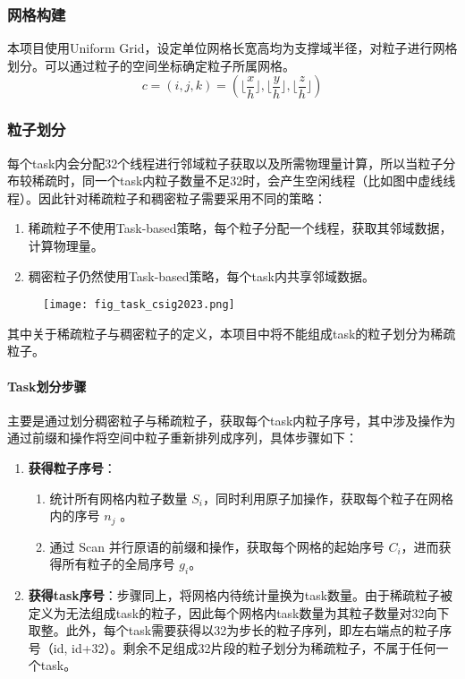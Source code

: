 \subsubsection{网格构建}
本项目使用Uniform Grid，设定单位网格长宽高均为支撑域半径，对粒子进行网格划分。可以通过粒子的空间坐标确定粒子所属网格。
\begin{equation}
	c=(i,j,k)=(\lfloor\frac{x}{h}\rfloor, \lfloor\frac{y}{h}\rfloor,\lfloor\frac{z}{h}\rfloor)
\end{equation}
\subsubsection{粒子划分}
每个task内会分配32个线程进行邻域粒子获取以及所需物理量计算，所以当粒子分布较稀疏时，同一个task内粒子数量不足32时，会产生空闲线程（比如图中虚线线程）。因此针对稀疏粒子和稠密粒子需要采用不同的策略：
\begin{enumerate}
	\item 稀疏粒子不使用Task-based策略，每个粒子分配一个线程，获取其邻域数据，计算物理量。
	\item 稠密粒子仍然使用Task-based策略，每个task内共享邻域数据。
\end{enumerate}

\begin{figure}[H]
	\centering
	\texttt{[image: fig\_task\_csig2023.png]}
\end{figure}

其中关于稀疏粒子与稠密粒子的定义，本项目中将不能组成task的粒子划分为稀疏粒子。
\paragraph{Task划分步骤}
主要是通过划分稠密粒子与稀疏粒子，获取每个task内粒子序号，其中涉及操作为通过前缀和操作将空间中粒子重新排列成序列，具体步骤如下：
\begin{enumerate}
	\item \textbf{获得粒子序号}：
	      \begin{enumerate}
		      \item 统计所有网格内粒子数量 $S_i$，同时利用原子加操作，获取每个粒子在网格内的序号 $n_j$ 。
		      \item 通过 Scan 并行原语的前缀和操作，获取每个网格的起始序号 $C_i$，进而获得所有粒子的全局序号 $g_i$。
	      \end{enumerate}
	\item \textbf{获得task序号}：步骤同上，将网格内待统计量换为task数量。由于稀疏粒子被定义为无法组成task的粒子，因此每个网格内task数量为其粒子数量对32向下取整。此外，每个task需要获得以32为步长的粒子序列，即左右端点的粒子序号（id, id+32）。剩余不足组成32片段的粒子划分为稀疏粒子，不属于任何一个task。
\end{enumerate}
